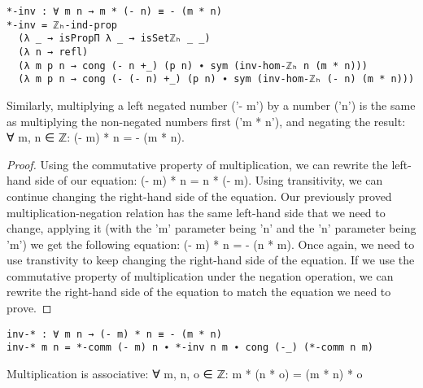 \begin{verbatim}
*-inv : ∀ m n → m * (- n) ≡ - (m * n)
*-inv = ℤₕ-ind-prop
  (λ _ → isPropΠ λ _ → isSetℤₕ _ _)
  (λ n → refl)
  (λ m p n → cong (- n +_) (p n) ∙ sym (inv-hom-ℤₕ n (m * n)))
  (λ m p n → cong (- (- n) +_) (p n) ∙ sym (inv-hom-ℤₕ (- n) (m * n)))
\end{verbatim}

\begin{theorem}
  Similarly, multiplying a left negated number ('- m') by a number ('n') is the same as multiplying the non-negated numbers first ('m * n'), and negating the result: ∀ m, n ∈ ℤ: (- m) * n = - (m * n).
\end{theorem}

\begin{proof}
  Using the commutative property of multiplication, we can rewrite the left-hand side of our equation: (- m) * n = n * (- m). Using transitivity, we can continue changing the right-hand side of the equation. Our previously proved multiplication-negation relation has the same left-hand side that we need to change, applying it (with the 'm' parameter being 'n' and the 'n' parameter being 'm') we get the following equation: (- m) * n = - (n * m). Once again, we need to use transtivity to keep changing the right-hand side of the equation. If we use the commutative property of multiplication under the negation operation, we can rewrite the right-hand side of the equation to match the equation we need to prove.
\end{proof}

\begin{verbatim}
inv-* : ∀ m n → (- m) * n ≡ - (m * n)
inv-* m n = *-comm (- m) n ∙ *-inv n m ∙ cong (-_) (*-comm n m)
\end{verbatim}

\begin{theorem}
  Multiplication is associative: ∀ m, n, o ∈ ℤ: m * (n * o) = (m * n) * o
\end{theorem}

